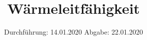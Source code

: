 

\subject{Versuch 204}
\title{Wärmeleitfähigkeit}
\date{%
  Durchführung: 14.01.2020
  \hspace{3em}
  Abgabe: 22.01.2020
}



\maketitle

\thispagestyle{empty}
\tableofcontents
\newpage



%



%

\printbibliography{}


